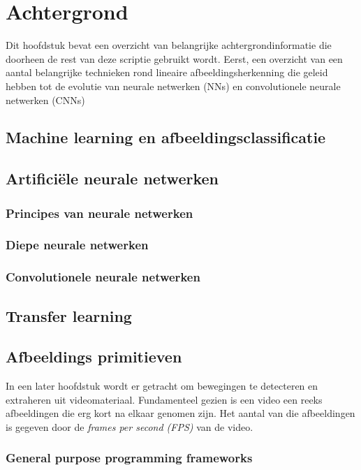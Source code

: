 \chapter{Achtergrond}
\label{chap:rel_work}

Dit hoofdstuk bevat een overzicht van belangrijke achtergrondinformatie die doorheen de rest van deze scriptie gebruikt wordt. Eerst, een overzicht van een aantal belangrijke technieken rond lineaire afbeeldingsherkenning die geleid hebben tot de evolutie van neurale netwerken (NNs) en convolutionele neurale netwerken (CNNs)

\section{Machine learning en afbeeldingsclassificatie}

\section{Artificiële neurale netwerken}
\subsection{Principes van neurale netwerken}
\subsection{Diepe neurale netwerken}
\subsection{Convolutionele neurale netwerken}
\section{Transfer learning}

\section{Afbeeldings primitieven}
\label{sec:related_work}

In een later hoofdstuk wordt er getracht om bewegingen te detecteren en extraheren uit videomateriaal. Fundamenteel gezien is een video een reeks afbeeldingen die erg kort na elkaar genomen zijn. Het aantal van die afbeeldingen is gegeven door de \textit{frames per second (FPS)} van de video.

\subsection{General purpose programming frameworks}
\label{subsec:gpp_frameworks}

